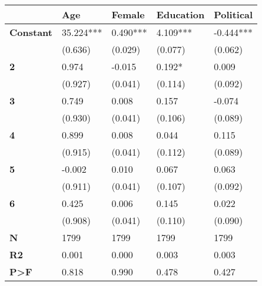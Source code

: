 \begin{tabular}{lllll}
\toprule
{} &        Age &    Female & Education &  Political \\
\midrule
\textbf{Constant} &  35.224*** &  0.490*** &  4.109*** &  -0.444*** \\
         &    (0.636) &   (0.029) &   (0.077) &    (0.062) \\
\textbf{2       } &      0.974 &    -0.015 &    0.192* &      0.009 \\
         &    (0.927) &   (0.041) &   (0.114) &    (0.092) \\
\textbf{3       } &      0.749 &     0.008 &     0.157 &     -0.074 \\
         &    (0.930) &   (0.041) &   (0.106) &    (0.089) \\
\textbf{4       } &      0.899 &     0.008 &     0.044 &      0.115 \\
         &    (0.915) &   (0.041) &   (0.112) &    (0.089) \\
\textbf{5       } &     -0.002 &     0.010 &     0.067 &      0.063 \\
         &    (0.911) &   (0.041) &   (0.107) &    (0.092) \\
\textbf{6       } &      0.425 &     0.006 &     0.145 &      0.022 \\
         &    (0.908) &   (0.041) &   (0.110) &    (0.090) \\
\textbf{N       } &       1799 &      1799 &      1799 &       1799 \\
\textbf{R2      } &      0.001 &     0.000 &     0.003 &      0.003 \\
\textbf{P>F     } &      0.818 &     0.990 &     0.478 &      0.427 \\
\bottomrule
\end{tabular}
